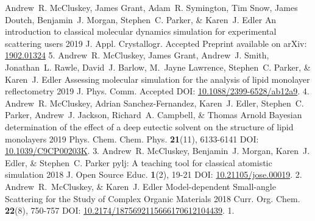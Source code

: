 \begin{cvpubys}
  \cvpuby
    {Andrew~R. McCluskey, James Grant, Adam~R. Symington, Tim Snow, James Doutch, Benjamin~J. Morgan, Stephen~C. Parker, \& Karen~J. Edler}
    {An introduction to classical molecular dynamics simulation for experimental scattering users}
    {2019}
    {J. Appl. Crystallogr.}
    {Accepted}
    {Preprint available on arXiv: \href{https://arxiv.org/abs/1902.01324}{1902.01324}}
    {5.}
  \cvpuby
    {Andrew~R. McCluskey, James Grant, Andrew~J. Smith, Jonathan~L. Rawle, David~J. Barlow, M.~Jayne Lawrence, Stephen~C. Parker, \& Karen~J. Edler}
    {Assessing molecular simulation for the analysis of lipid monolayer reflectometry}
    {2019}
    {J. Phys. Comm.}
    {Accepted}
    {DOI: \href{https://doi.org/10.1088/2399-6528/ab12a9}{10.1088/2399-6528/ab12a9}.}
    {4.}
  \cvpuby
    {Andrew~R. McCluskey, Adrian Sanchez-Fernandez, Karen~J. Edler, Stephen~C. Parker, Andrew~J. Jackson, Richard~A. Campbell, \& Thomas Arnold}
    {Bayesian determination of the effect of a deep eutectic solvent on the structure of lipid monolayers}
    {2019}
    {Phys. Chem. Chem. Phys.}
    {\textbf{21}(11), 6133-6141}
    {DOI: \href{https://doi.org/10.1039/C9CP00203K}{10.1039/C9CP00203K}.}
    {3.}
  \cvpuby
    {Andrew~R. McCluskey, Benjamin~J. Morgan, Karen~J. Edler, \& Stephen~C. Parker}
    {pylj: A teaching tool for classical atomistic simulation}
    {2018}
    {J. Open Source Educ.}
    {\textbf{1}(2), 19-21}
    {DOI: \href{http://doi.org/10.21105/jose.00019}{10.21105/jose.00019}.}
    {2.}
  \cvpuby
    {Andrew~R.~McCluskey, \& Karen~J. Edler}
    {Model-dependent Small-angle Scattering for the Study of Complex Organic Materials}
    {2018}
    {Curr. Org. Chem.}
    {\textbf{22}(8), 750-757}
    {DOI: \href{http://doi.org/10.2174/1875692115666170612104439}{10.2174/1875692115666170612104439}.}
    {1.}
\end{cvpubys}
